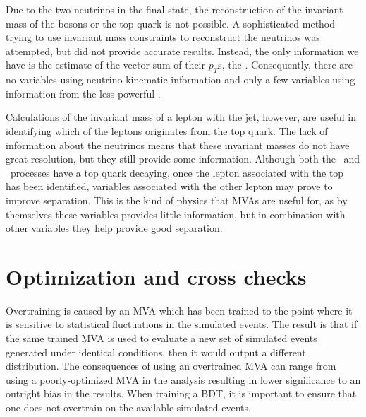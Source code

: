 Due to the two neutrinos in the final state, the reconstruction of the invariant mass of the \Wboson bosons or the top quark is not possible. A sophisticated method trying to use invariant mass constraints to reconstruct the neutrinos was attempted, but did not provide accurate results. Instead, the only information we have is the estimate of the vector sum of their $p_T$s, the \MET. Consequently, there are no variables using neutrino kinematic information and only a few variables using information from the less powerful \MET.

Calculations of the invariant mass of a lepton with the jet, however, are useful in identifying which of the leptons originates from the top quark. The lack of information about the neutrinos means that these invariant masses do not have great resolution, but they still provide some information. Although both the \ttbar\ and \Wtchan\ processes have a top quark decaying, once the lepton associated with the top has been identified, variables associated with the other lepton may prove to improve separation. This is the kind of physics that MVAs are useful for, as by themselves these variables provides little information, but in combination with other variables they help provide good separation. 





\section{Optimization and cross checks}
\label{SECTION-OURBDT}
Overtraining is caused by an MVA which has been trained to the point where it is sensitive to statistical fluctuations in the simulated events. The result is that if the same trained MVA is used to evaluate a new set of simulated events generated under identical conditions, then it would output a different distribution. The consequences of using an overtrained MVA can range from using a poorly-optimized MVA in the analysis resulting in lower significance to an outright bias in the results. When training a BDT, it is important to ensure that one does not overtrain on the available simulated events.

